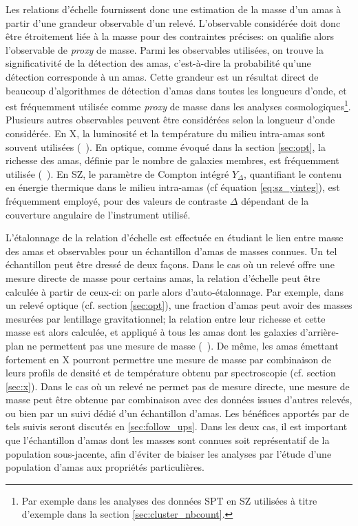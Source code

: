 Les relations d'échelle fournissent donc une estimation de la masse d'un amas à partir d'une grandeur observable d'un relevé.
L'observable considérée doit donc être étroitement liée à la masse pour des contraintes précises: on qualifie alors l'observable de \textit{proxy} de masse.
Parmi les observables utilisées, on trouve la significativité de la détection des amas, c'est-à-dire la probabilité qu'une détection corresponde à un amas.
Cette grandeur est un résultat direct de beaucoup d'algorithmes de détection d'amas dans toutes les longueurs d'onde, et est fréquemment utilisée comme \textit{proxy} de masse dans les analyses cosmologiques\footnote{Par exemple dans les analyses des données SPT en SZ \cite{bocquet_cluster_2019} utilisées à titre d'exemple dans la section \ref{sec:cluster_nbcount}.}.
Plusieurs autres observables peuvent être considérées selon la longueur d'onde considérée.
En X, la luminosité et la température du milieu intra-amas sont souvent utilisées (\eg\ \cite{pacaud_xxl_2018}).
En optique, comme évoqué dans la section \ref{sec:opt}, la richesse des amas, définie par le nombre de galaxies membres, est fréquemment utilisée (\eg\ \cite{des_collaboration_dark_2020}).
En SZ, le paramètre de Compton intégré $Y_\Delta$, quantifiant le contenu en énergie thermique dans le milieu intra-amas (cf équation \ref{eq:sz_yinteg}), est fréquemment employé, pour des valeurs de contraste $\Delta$ dépendant de la couverture angulaire de l'instrument utilisé.

L'étalonnage de la relation d'échelle est effectuée en étudiant le lien entre masse des amas et observables pour un échantillon d'amas de masses connues.
Un tel échantillon peut être dressé de deux façons.
Dans le cas où un relevé offre une mesure directe de masse pour certains amas, la relation d'échelle peut être calculée à partir de ceux-ci: on parle alors d'auto-étalonnage.
Par exemple, dans un relevé optique (cf. section \ref{sec:opt}), une fraction d'amas peut avoir des masses mesurées par lentillage gravitationnel; la relation entre leur richesse et cette masse est alors calculée, et appliqué à tous les amas dont les galaxies d'arrière-plan ne permettent pas une mesure de masse (\eg\ \cite{andreon_richness-mass_2012}).
De même, les amas émettant fortement en X pourront permettre une mesure de masse par combinaison de leurs profils de densité et de température obtenu par spectroscopie (cf. section \ref{sec:x}).
Dans le cas où un relevé ne permet pas de mesure directe, une mesure de masse peut être obtenue par combinaison avec des données issues d'autres relevés, ou bien par un suivi dédié d'un échantillon d'amas.
Les bénéfices apportés par de tels suivis seront discutés en \ref{sec:follow_ups}.
Dans les deux cas, il est important que l'échantillon d'amas dont les masses sont connues soit représentatif de la population sous-jacente, afin d'éviter de biaiser les analyses par l'étude d'une population d'amas aux propriétés particulières.

